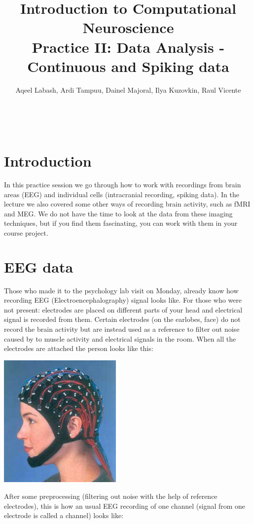 \documentclass[a4paper,11pt]{article}
\author{\large{Aqeel Labash, Ardi Tampuu, Dainel Majoral, Ilya Kuzovkin, Raul Vicente}}
\title{\huge{Introduction to Computational Neuroscience}\\\LARGE{Practice II: Data Analysis - Continuous and Spiking data}}
\begin{document}
\maketitle
\ \\
\section{Introduction}
In this practice session we go through how to work with recordings from brain areas (EEG) and individual cells (intracranial recording, spiking data). In the lecture we also covered some other ways of recording brain activity, such as fMRI and MEG. We do not have the time to look at the data from these imaging techniques, but if you find them fascinating, you can work with them in your course project.

\section{EEG data}
Those who made it to the psychology lab visit on Monday, already know how recording EEG (Electroencephalography) signal looks like. For those who were not present: electrodes are placed on different parts of your head and electrical signal is recorded from them. Certain electrodes (on the earlobes, face) do not record the brain activity but are instead used as a reference to filter out noise caused by to muscle activity and electrical signals in the room. When all the electrodes are attached the person looks like this:\\
\begin{center}
\includegraphics[width=6cm]{eeg.jpg}
\end{center}
After some preprocessing (filtering out noise with the help of reference electrodes), this is how an usual EEG recording of one channel (signal from one electrode is called a channel) looks like:
\end{document}
